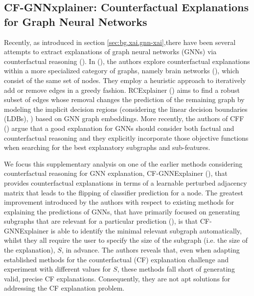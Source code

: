 \documentclass[binding=0.6cm]{sapthesis}
\newcommand{\mycite}[1]{(\cite{#1})}
\begin{document}
\subsection{CF-GNNxplainer: Counterfactual Explanations for Graph Neural Networks}
\label{sec:cfpg.bg.cf-gnn}
Recently, as introduced in section \ref{sec:bg.xai.gnn-xai},there have been several attempts to extract explanations of graph neural networks (GNNs) via counterfactual reasoning \mycite{abrate2021-brain-networks,lucic2022-cfgnnexplainer,tan2022-learn-eval-cf,bajaj2022-robustCF}. In \mycite{abrate2021-brain-networks}, the authors explore counterfactual explanations within a more specialized category of graphs, namely brain networks \mycite{riedl2015-metabolicCM}, which consist of the same set of nodes. They employ a heuristic approach to iteratively add or remove edges in a greedy fashion. RCExplainer \mycite{bajaj2022-robustCF} aims to find a robust subset of edges whose removal changes the prediction of the remaining graph by modeling the implicit decision regions (considering the linear decision boundaries (LDBs), \cite{chu2018-exact-consistent}) based on GNN graph embeddings. More recently, the authors of CFF \mycite{tan2022-learn-eval-cf} argue that a good explanation for GNNs should consider both factual and counterfactual reasoning and they explicitly incorporate those objective functions when searching for the best explanatory subgraphs and sub-features.

We focus this supplementary analysis on one of the earlier methods considering counterfactual reasoning for GNN explanation, CF-GNNExplainer \mycite{lucic2022-cfgnnexplainer}, that provides counterfactual explanations in terms of a learnable perturbed adjacency matrix that leads to the flipping of classifier prediction for a node. The greatest improvement introduced by the authors with respect to existing methods for explaining the predictions of GNNs, that have primarily focused on generating subgraphs that are relevant for a particular prediction (\cite{yuan2020-xgnn,baldassarre2019-explainability,luo2020-pgexplainer,pope2019-CVPR,schlichtkrull2022-interpreting,ying2019-gnnexplainer,yuan2021-subgraphx,vu2020-pgm-explainer,lin2021-causal-expl}), is that CF-GNNExplainer is able to identify the minimal relevant subgraph automatically, whilst they all require the user to specify the size of the subgraph (i.e. the size of the explanation), $S$, in advance. The authors reveals that, even when adapting established methods for the counterfactual (CF) explanation challenge and experiment with different values for $S$, these methods fall short of generating valid, precise CF explanations. Consequently, they are not apt solutions for addressing the CF explanation problem.
\end{document}
